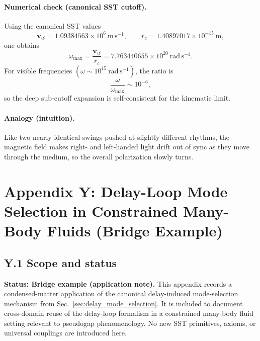 \documentclass[10pt]{article}
\begin{document}
        \paragraph{Numerical check (canonical SST cutoff).}
            Using the canonical SST values
            \[
                \mathbf{v}_{\!\boldsymbol{\circlearrowleft}}=1.09384563\times 10^6\ \mathrm{m\,s^{-1}},
                \qquad
                r_c=1.40897017\times 10^{-15}\ \mathrm{m},
            \]
            one obtains
            \[
                \omega_{\max}
                =
                \frac{\mathbf{v}_{\!\boldsymbol{\circlearrowleft}}}{r_c}
                =
                7.763440655\times 10^{20}\ \mathrm{rad\,s^{-1}}.
            \]
            For visible frequencies \((\omega\sim 10^{15}\ \mathrm{rad\,s^{-1}})\), the ratio is
            \[
                \frac{\omega}{\omega_{\max}}\sim 10^{-6},
            \]
            so the deep sub-cutoff expansion is self-consistent for the kinematic limit.
        
        \paragraph{Analogy (intuition).}
            Like two nearly identical swings pushed at slightly different rhythms, the magnetic field makes right- and left-handed light drift out of sync as they move through the medium, so the overall polarization slowly turns.


    \section*{Appendix Y: Delay-Loop Mode Selection in Constrained Many-Body Fluids (Bridge Example)}
    \label{app:pseudogap_delay_bridge}

    \subsection*{Y.1 Scope and status}
    \textbf{Status: Bridge example (application note).}
    This appendix records a condensed-matter application of the canonical delay-induced mode-selection mechanism from Sec.~\ref{sec:delay_mode_selection}.
    It is included to document cross-domain reuse of the delay-loop formalism in a constrained many-body fluid setting relevant to pseudogap phenomenology.
    No new SST primitives, axioms, or universal couplings are introduced here.
\end{document}

